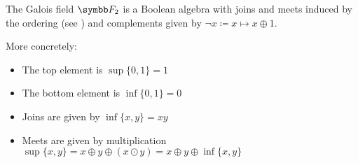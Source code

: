 \begin{theorem}\label{thm:f2_is_boolean_algebra}
  The Galois field \( \BF_2 \) is a Boolean algebra with joins and meets induced by the ordering (see ) and complements given by \( \neg x \coloneqq x \mapsto x \oplus 1 \).

  More concretely:
  \begin{itemize}
    \item The top element is \( \sup \{ 0, 1 \} = 1 \)
    \item The bottom element is \( \inf \{ 0, 1 \} = 0 \)
    \item Joins are given by \( \inf \{ x, y \} = xy \)
    \item Meets are given by multiplication \( \sup \{ x, y \} = x \oplus y \oplus (x \odot y) = x \oplus y \oplus \inf \{ x, y \} \)
  \end{itemize}
\end{theorem}
